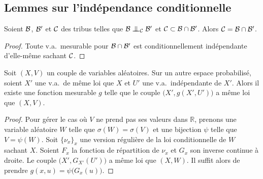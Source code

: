 \documentclass[12pt,a4paper]{article}
\begin{document}
\begin{appendices}

\section{Lemmes sur l'indépendance conditionnelle}

\begin{lemme}\label{lemme:CIinter}
Soient $\mathcal{B}$, $\mathcal{B}'$ et $\mathcal{C}$ des tribus telles que $\BB \indep_\CC \BB'$ 
et $\mathcal{C} \subset \mathcal{B} \cap \mathcal{B}'$. Alors $\mathcal{C} = \mathcal{B}\cap\mathcal{B}'$.
\end{lemme}

\begin{proof}
Toute v.a.\ mesurable pour $\mathcal{B}\cap\mathcal{B}'$ est conditionnellement indépendante 
d'elle-même sachant $\mathcal{C}$. 
\end{proof}

\begin{lemme}\label{lemme:representation}
Soit $(X,V)$ un couple de variables aléatoires.  
Sur un autre espace probabilisé, soient $X'$ une v.a.\ de même loi que 
$X$ et $U'$ une v.a.\ indépendante de $X'$. 
Alors il existe une fonction mesurable $g$ telle que le couple 
$\bigl(X', g(X',U')\bigr)$ a même loi que $(X,V)$. 
\end{lemme}

\begin{proof}
Pour gérer le cas où $V$ ne prend pas ses valeurs dans $\mathbb{R}$, prenons 
une variable aléatoire $W$ telle que $\sigma(W)=\sigma(V)$ et une bijection 
$\psi$ telle que $V=\psi(W)$. 
Soit $\{\nu_x\}_{x}$ une version régulière de la loi conditionnelle 
de $W$ sachant $X$. Soient $F_x$ la fonction de répartition de $\nu_x$ 
et $G_x$ son inverse continue à droite. 
Le couple $\bigl(X', G_{X'}(U')\bigr)$ a même loi que $(X,W)$. 
 Il suffit alors de prendre $g(x,u) = \psi\bigl(G_x(u)\bigr)$. 
\end{proof}



\begin{lemme}\label{lemme:representation2}
%  


\end{lemme}
\end{appendices}
\end{document}
